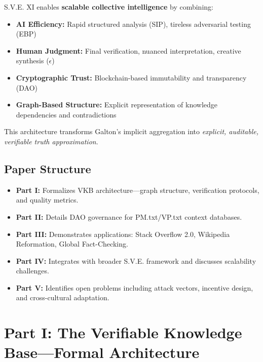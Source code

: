 \documentclass[11pt,a4paper]{article}
\theoremstyle{definition}
\theoremstyle{remark}
\newcommand{\VKB}{\textsc{VKB}}
\newcommand{\SIP}{\textsc{SIP}}
\newcommand{\EBP}{\textsc{EBP}}
\newcommand{\DAO}{\textsc{DAO}}
\begin{document}
\begin{mdframed}[style=keybox, frametitle={Core Innovation: Hybrid Verification at Scale}]
S.V.E. XI enables \textbf{scalable collective intelligence} by combining:
\begin{itemize}
    \item \textbf{AI Efficiency:} Rapid structured analysis (\SIP{}), tireless adversarial testing (\EBP{})
    \item \textbf{Human Judgment:} Final verification, nuanced interpretation, creative synthesis ($\epsilon$)
    \item \textbf{Cryptographic Trust:} Blockchain-based immutability and transparency (\DAO{})
    \item \textbf{Graph-Based Structure:} Explicit representation of knowledge dependencies and contradictions
\end{itemize}
This architecture transforms Galton's implicit aggregation into \textit{explicit, auditable, verifiable truth approximation}.
\end{mdframed}

\subsection{Paper Structure}

\begin{itemize}
    \item \textbf{Part I:} Formalizes \VKB{} architecture—graph structure, verification protocols, and quality metrics.
    \item \textbf{Part II:} Details \DAO{} governance for PM.txt/VP.txt context databases.
    \item \textbf{Part III:} Demonstrates applications: Stack Overflow 2.0, Wikipedia Reformation, Global Fact-Checking.
    \item \textbf{Part IV:} Integrates with broader S.V.E. framework and discusses scalability challenges.
    \item \textbf{Part V:} Identifies open problems including attack vectors, incentive design, and cross-cultural adaptation.
\end{itemize}

\section{Part I: The Verifiable Knowledge Base—Formal Architecture}
\end{document}
